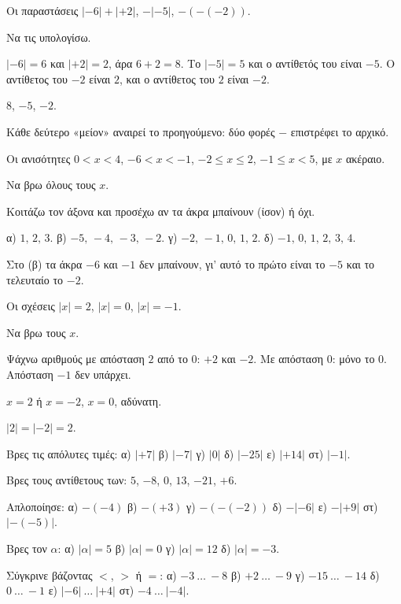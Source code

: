\tixero Οι παραστάσεις $|-6|+|+2|$, $-|-5|$, $-(-(-2))$.\par
\tithelo Να τις υπολογίσω.\par
\possindeo $|-6|=6$ και $|+2|=2$, άρα $6+2=8$. Το $|-5|=5$ και ο αντίθετός του είναι $-5$. Ο αντίθετος του $-2$ είναι $2$, και ο αντίθετος του $2$ είναι $-2$.\par
\apantisi $8$, $-5$, $-2$.\par
\elegxos Κάθε δεύτερο «μείον» αναιρεί το προηγούμενο: δύο φορές $-$ επιστρέφει το αρχικό.

\tixero Οι ανισότητες $0<x<4$, $-6<x<-1$, $-2\le x\le2$, $-1\le x<5$, με $x$ ακέραιο.\par
\tithelo Να βρω όλους τους $x$.\par
\possindeo Κοιτάζω τον άξονα και προσέχω αν τα άκρα μπαίνουν (ίσον) ή όχι.\par
\apantisi α) $1,\,2,\,3$. β) $-5,\,-4,\,-3,\,-2$. γ) $-2,\,-1,\,0,\,1,\,2$. δ) $-1,\,0,\,1,\,2,\,3,\,4$.\par
\elegxos Στο (β) τα άκρα $-6$ και $-1$ δεν μπαίνουν, γι' αυτό το πρώτο είναι το $-5$ και το τελευταίο το $-2$.

\tixero Οι σχέσεις $|x|=2$, $|x|=0$, $|x|=-1$.\par
\tithelo Να βρω τους $x$.\par
\possindeo Ψάχνω αριθμούς με απόσταση $2$ από το $0$: $+2$ και $-2$. Με απόσταση $0$: μόνο το $0$. Απόσταση $-1$ δεν υπάρχει.\par
\apantisi $x=2$ ή $x=-2$, $x=0$, αδύνατη.\par
\elegxos $|2|=|-2|=2$.



\ex Βρες τις απόλυτες τιμές: α) $|+7|$ \quad β) $|-7|$ \quad γ) $|0|$ \quad δ) $|-25|$ \quad ε) $|+14|$ \quad στ) $|-1|$.

\ex Βρες τους αντίθετους των: $5$, $-8$, $0$, $13$, $-21$, $+6$.

\ex Απλοποίησε: α) $-(-4)$ \quad β) $-(+3)$ \quad γ) $-(-(-2))$ \quad δ) $-|-6|$ \quad ε) $-|+9|$ \quad στ) $|-(-5)|$.

\ex Βρες τον $\alpha$: α) $|\alpha|=5$ \quad β) $|\alpha|=0$ \quad γ) $|\alpha|=12$ \quad δ) $|\alpha|=-3$.

\ex Σύγκρινε βάζοντας $<$, $>$ ή $=$: α) $-3\ \ldots\ -8$ \quad β) $+2\ \ldots\ -9$ \quad γ) $-15\ \ldots\ -14$ \quad δ) $0\ \ldots\ -1$ \quad ε) $|-6|\ \ldots\ |+4|$ \quad στ) $-4\ \ldots\ |-4|$.

